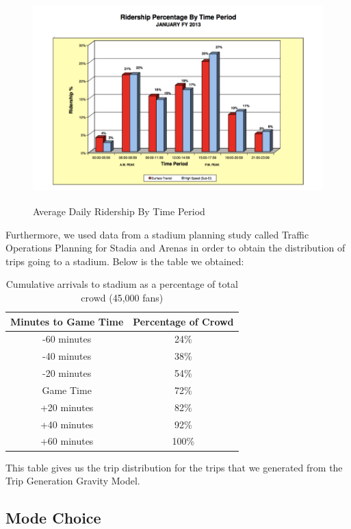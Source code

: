 \begin{figure}[htp]
  \centering
  \includegraphics[height=8cm]{graphics/ridership-per-period.png}
  \caption{Average Daily Ridership By Time Period}
  \label{fig-ridership-per-period}
\end{figure}

Furthermore, we used data from a stadium planning study called Traffic
Operations Planning for Stadia and Arenas in order to obtain the
distribution of trips going to a stadium. Below is the table we
obtained:

\begin{table}
  \centering
  \begin{tabular}{cc}
    Minutes to Game Time & Percentage of Crowd \\
    \hline\hline
    -60 minutes & 24\% \\
    -40 minutes & 38\% \\
    -20 minutes & 54\% \\
     Game Time  & 72\% \\
    +20 minutes & 82\% \\
    +40 minutes & 92\% \\
    +60 minutes & 100\% \\
  \end{tabular}
  \caption{Cumulative arrivals to stadium as a percentage of total crowd (45,000 fans)}
  \label{tab-arrivals}
\end{table}

This table gives us the trip distribution for the trips that we
generated from the Trip Generation Gravity Model.


\subsection{Mode Choice}

